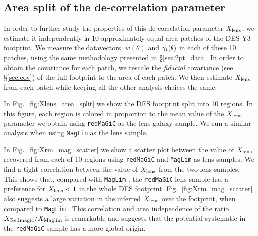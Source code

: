 \documentclass[aps, prd,twocolumn,superscriptaddress,nofootinbib,preprintnumbers]{revtex4-1}
\newcommand{\gammat}{\ensuremath{\gamma_{\rm t}(\theta)}}
\newcommand{\redmagic}{\texttt{redMaGiC} }
\newcommand{\maglim}{\texttt{MagLim} }
\newcommand{\SP}[1]{{\color{red}[SP: #1]}}
\begin{document}
\subsection{Area split of the de-correlation parameter}
In order to further study the properties of this de-correlation parameter $X_{\rm lens}$, we estimate it independently in 10 approximately equal area patches  of the DES Y3 footprint.  We measure the datavectors, $w(\theta)$ and $\gammat$ in each of these 10 patches, using the same methodology presented in \S\ref{sec:2pt_data}. In order to obtain the covariance for each patch, we rescale the \textit{fiducial} covariance (see \S\ref{sec:cov}) of the full footprint to the area of each patch. We then estimate  $X_{\rm lens}$ from each patch while keeping all the other analysis choices the same. 

In Fig.~\ref{fig:Xlens_area_split} we show the DES footprint split into 10 regions. In this figure, each region is colored in proportion to the mean value of the $X_{\rm lens}$ parameter we obtain using \redmagic as the lens galaxy sample. We run a similar analysis when using \maglim as the lens sample. 


In Fig.~\ref{fig:Xrm_mag_scatter} we show a scatter plot between the value of $X_{\rm lens}$ recovered from each of 10 regions using \redmagic and \maglim as lens samples. We find a tight correlation between the value of $X_{\rm lens}$ from the two lens samples. This shows that, compared with \maglim, the \redmagic lens sample has a preference for $X_{\rm lens} < 1$ in the whole DES footprint. Fig.~\ref{fig:Xrm_mag_scatter} also suggests a large variation  in the inferred $X_{\rm lens}$ over the footprint, when compared to \maglim. This correlation and area independence of the ratio $X_{\rm Redmagic}/X_{\rm Maglim}$ is remarkable and suggests that the potential systematic in the \redmagic sample has a more global origin. 

\end{document}

